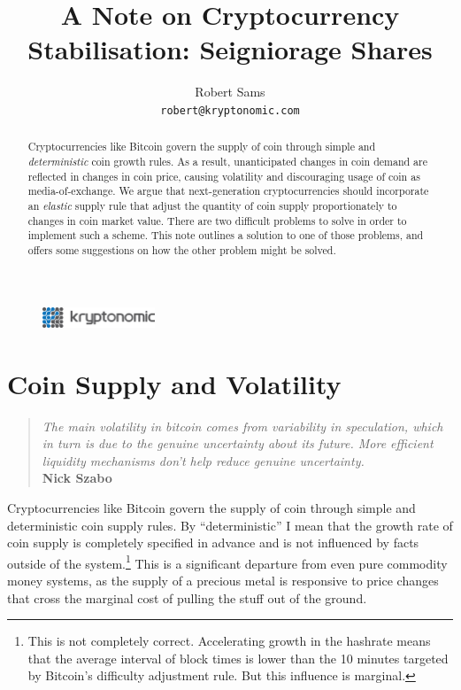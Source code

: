 \documentclass[twocolumn]{article}
\begin{document}
\onecolumn
\begin{figure}[b!]
\centering
\includegraphics[keepaspectratio, width=0.3\textwidth]{./logo.png}
\end{figure}
\title{A Note on Cryptocurrency Stabilisation: Seigniorage Shares}
\usdate
\author{Robert Sams\\\texttt{robert@kryptonomic.com}}
\maketitle
\begin{abstract}
  Cryptocurrencies like Bitcoin govern the supply of coin through
  simple and \emph{deterministic} coin growth rules. As a result,
  unanticipated changes in coin demand are reflected in changes in
  coin price, causing volatility and discouraging usage of coin as
  media-of-exchange. We argue that next-generation cryptocurrencies
  should incorporate an \emph{elastic} supply rule that adjust the
  quantity of coin supply proportionately to changes in coin market
  value. There are two difficult problems to solve in order to
  implement such a scheme. This note outlines a solution to one of
  those problems, and offers some suggestions on how the other problem
  might be solved.
\end{abstract}
\titlepage


\twocolumn
\section*{Coin Supply and Volatility}
\begin{quote}
\textit{The main volatility in bitcoin comes from variability in
speculation, which in turn is due to the genuine uncertainty about its
future. More efficient liquidity mechanisms don't help reduce genuine
uncertainty.\cite{szabo}}\\\textbf{Nick Szabo}
\end{quote}
Cryptocurrencies like Bitcoin govern the supply of coin through simple
and deterministic coin supply rules. By ``deterministic'' I mean that
the growth rate of coin supply is completely specified in advance and
is not influenced by facts outside of the system.\footnote{This is not
  completely correct. Accelerating growth in the hashrate means that
  the average interval of block times is lower than the 10 minutes
  targeted by Bitcoin's difficulty adjustment rule. But this
  influence is marginal.} This is a significant departure from even
pure commodity money systems, as the supply of a precious metal is
responsive to price changes that cross the marginal cost of pulling
the stuff out of the ground.
\end{document}
